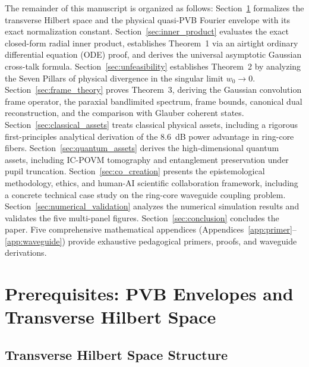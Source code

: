 \documentclass{optica-article}
\begin{document}
The remainder of this manuscript is organized as follows: Section~\ref{sec:prerequisites} formalizes the transverse Hilbert space and the physical quasi-PVB Fourier envelope with its exact normalization constant. Section~\ref{sec:inner_product} evaluates the exact closed-form radial inner product, establishes Theorem~1 via an airtight ordinary differential equation (ODE) proof, and derives the universal asymptotic Gaussian cross-talk formula. Section~\ref{sec:unfeasibility} establishes Theorem~2 by analyzing the Seven Pillars of physical divergence in the singular limit $w_0 \to 0$. Section~\ref{sec:frame_theory} proves Theorem~3, deriving the Gaussian convolution frame operator, the paraxial bandlimited spectrum, frame bounds, canonical dual reconstruction, and the comparison with Glauber coherent states. Section~\ref{sec:classical_assets} treats classical physical assets, including a rigorous first-principles analytical derivation of the 8.6~dB power advantage in ring-core fibers. Section~\ref{sec:quantum_assets} derives the high-dimensional quantum assets, including IC-POVM tomography and entanglement preservation under pupil truncation. Section~\ref{sec:co_creation} presents the epistemological methodology, ethics, and human-AI scientific collaboration framework, including a concrete technical case study on the ring-core waveguide coupling problem. Section~\ref{sec:numerical_validation} analyzes the numerical simulation results and validates the five multi-panel figures. Section~\ref{sec:conclusion} concludes the paper. Five comprehensive mathematical appendices (Appendices~\ref{app:primer}--\ref{app:waveguide}) provide exhaustive pedagogical primers, proofs, and waveguide derivations.

\section{Prerequisites: PVB Envelopes and Transverse Hilbert Space}
\label{sec:prerequisites}

\subsection{Transverse Hilbert Space Structure}
\end{document}
